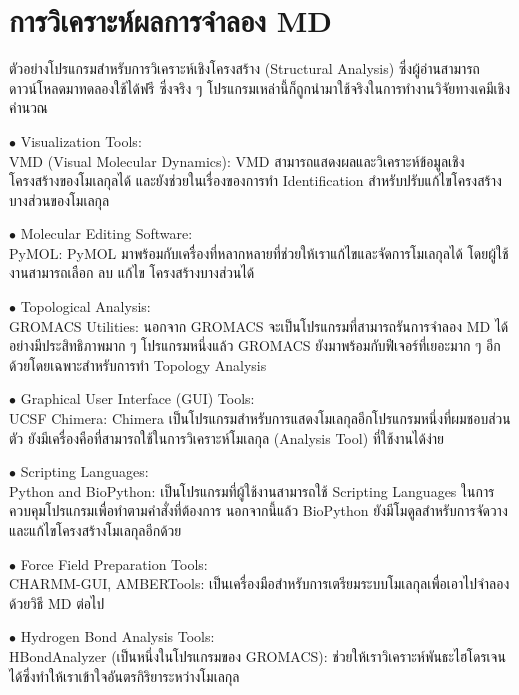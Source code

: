 \section{การวิเคราะห์ผลการจำลอง MD}

ตัวอย่างโปรแกรมสำหรับการวิเคราะห์เชิงโครงสร้าง (Structural Analysis) ซึ่งผู้อ่านสามารถดาวน์โหลดมาทดลองใช้ได้ฟรี ซึ่งจริง ๆ
โปรแกรมเหล่านี้ก็ถูกนำมาใช้จริงในการทำงานวิจัยทางเคมีเชิงคำนวณ

\noindent $\bullet$ Visualization Tools: \\
VMD (Visual Molecular Dynamics): VMD สามารถแสดงผลและวิเคราะห์ข้อมูลเชิงโครงสร้างของโมเลกุลได้ และยังช่วยในเรื่องของการทำ
Identification สำหรับปรับแก้ไขโครงสร้างบางส่วนของโมเลกุล

\noindent $\bullet$ Molecular Editing Software: \\
PyMOL: PyMOL มาพร้อมกับเครื่องที่หลากหลายที่ช่วยให้เราแก้ไขและจัดการโมเลกุลได้ โดยผู้ใช้งานสามารถเลือก ลบ แก้ไข โครงสร้างบางส่วนได้

\noindent $\bullet$ Topological Analysis: \\
GROMACS Utilities: นอกจาก GROMACS จะเป็นโปรแกรมที่สามารถรันการจำลอง MD ได้อย่างมีประสิทธิภาพมาก ๆ โปรแกรมหนึ่งแล้ว GROMACS
ยังมาพร้อมกับฟีเจอร์ที่เยอะมาก ๆ อีกด้วยโดยเฉพาะสำหรับการทำ Topology Analysis

\noindent $\bullet$ Graphical User Interface (GUI) Tools: \\
UCSF Chimera: Chimera เป็นโปรแกรมสำหรับการแสดงโมเลกุลอีกโปรแกรมหนึ่งที่ผมชอบส่วนตัว ยังมีเครื่องคือที่สามารถใช้ในการวิเคราะห์โมเลกุล
(Analysis Tool) ที่ใช้งานได้ง่าย

\noindent $\bullet$ Scripting Languages: \\
Python and BioPython: เป็นโปรแกรมที่ผู้ใช้งานสามารถใช้ Scripting Languages ในการควบคุมโปรแกรมเพื่อทำตามคำสั่งที่ต้องการ
นอกจากนี้แล้ว BioPython ยังมีโมดูลสำหรับการจัดวางและแก้ไขโครงสร้างโมเลกุลอีกด้วย

\noindent $\bullet$ Force Field Preparation Tools: \\
CHARMM-GUI, AMBERTools: เป็นเครื่องมือสำหรับการเตรียมระบบโมเลกุลเพื่อเอาไปจำลองด้วยวิธี MD ต่อไป

\noindent $\bullet$ Hydrogen Bond Analysis Tools: \\
HBondAnalyzer (เป็นหนึ่งในโปรแกรมของ GROMACS): ช่วยให้เราวิเคราะห์พันธะไฮโดรเจนได้ซึ่งทำให้เราเข้าใจอันตรกิริยาระหว่างโมเลกุล

